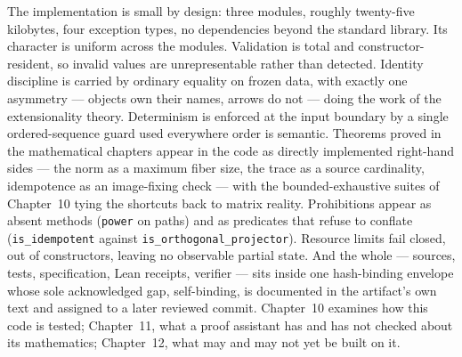 The implementation is small by design: three modules, roughly twenty-five
kilobytes, four exception types, no dependencies beyond the standard
library. Its character is uniform across the modules. Validation is total
and constructor-resident, so invalid values are unrepresentable rather than
detected. Identity discipline is carried by ordinary equality on frozen
data, with exactly one asymmetry --- objects own their names, arrows do not
--- doing the work of the extensionality theory. Determinism is enforced at
the input boundary by a single ordered-sequence guard used everywhere order
is semantic. Theorems proved in the mathematical chapters appear in the
code as directly implemented right-hand sides --- the norm as a maximum
fiber size, the trace as a source cardinality, idempotence as an
image-fixing check --- with the bounded-exhaustive suites of Chapter~10
tying the shortcuts back to matrix reality. Prohibitions appear as absent
methods (\texttt{power} on paths) and as predicates that refuse to conflate
(\texttt{is\_idempotent} against \texttt{is\_orthogonal\_projector}).
Resource limits fail closed, out of constructors, leaving no observable
partial state. And the whole --- sources, tests, specification, Lean
receipts, verifier --- sits inside one hash-binding envelope whose sole
acknowledged gap, self-binding, is documented in the artifact's own text
and assigned to a later reviewed commit. Chapter~10 examines how this code
is tested; Chapter~11, what a proof assistant has and has not checked about
its mathematics; Chapter~12, what may and may not yet be built on it.
